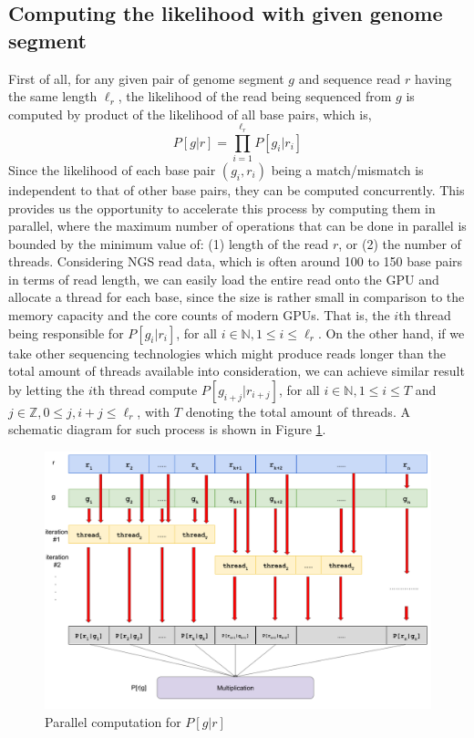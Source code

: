 \documentclass{PHlab-thesis}
\begin{document}
\subsection{Computing the likelihood with given genome segment}
First of all, for any given pair of genome segment $g$ and sequence read $r$ having the same length $\ell_r$, the likelihood of the read being sequenced from $g$ is computed by product of the likelihood of all base pairs, which is, 
\begin{equation}
	P[g|r] = \prod_{i=1}^{\ell_r} P[g_i|r_i]
\end{equation}
Since the likelihood of each base pair $(g_i, r_i)$ being a match/mismatch is independent to that of other base pairs, they can be computed concurrently. This provides us the opportunity to accelerate this process by computing them in parallel, where the maximum number of operations that can be done in parallel is bounded by the minimum value of: (1) length of the read $r$, or (2) the number of threads. Considering NGS read data, which is often around 100 to 150 base pairs in terms of read length, we can easily load the entire read onto the GPU and allocate a thread for each base, since the size is rather small in comparison to the memory capacity and the core counts of modern GPUs. That is, the $i$th thread being responsible for $P[g_i|r_i]$, for all $i \in \mathbb{N} , 1 \leq i \leq {\ell_r}$. On the other hand, if we take other sequencing technologies which might produce reads longer than the total amount of threads available into consideration, we can achieve similar result by letting the $i$th thread compute $P[g_{i+j}|r_{i+j}]$, for all $i \in \mathbb{N} ,1 \leq i \leq T$ and $j \in \mathbb{Z} ,0 \leq j, i+j \leq {\ell_r}$, with $T$ denoting the total amount of threads. A schematic diagram for such process is shown in Figure \ref{fig:prg}.
\begin{figure}
	\centering
	\includegraphics[scale=0.3]{figures/method1.png}
	\caption{Parallel computation for $P[g|r]$}
	\label{fig:prg} %
\end{figure}
\end{document}

